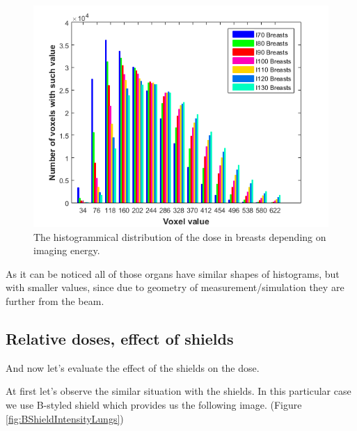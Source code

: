\documentclass[fleqn,10pt]{SelfArx} %
\begin{document}
\begin{figure}[!htb]\centering
\includegraphics[width=\linewidth]{NoShieldBreasts}
\caption{The histogrammical distribution of the dose in breasts depending on imaging energy.}
\label{fig:NoShieldBreasts}
\end{figure}

As it can be noticed all of those organs have similar shapes of histograms, but with smaller values, since due to geometry of measurement/simulation they are further from the beam.



\subsection{Relative doses, effect of shields}

And now let's evaluate the effect of the shields on the dose.

At first let's observe the similar situation with the shields. In this particular case we use B-styled shield which provides us the following image. (Figure \ref{fig:BShieldIntensityLungs})
\end{document}

